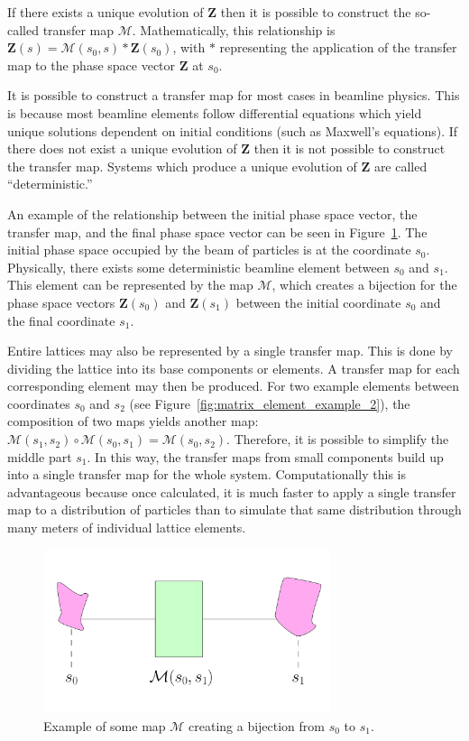 If there exists a unique evolution of $\mathbf{Z}$ then it is possible to construct the so-called transfer map $\mathcal{M}$. Mathematically, this relationship is $\mathbf{Z}(s)=\mathcal{M}(s_0 , s)*\mathbf{Z}(s_0)$, with $*$ representing the application of the transfer map to the phase space vector $\mathbf{Z}$ at $s_0$. 

It is possible to construct a transfer map for most cases in beamline physics. This is because most beamline elements follow differential equations which yield unique solutions dependent on initial conditions (such as Maxwell's equations). If there does not exist a unique evolution of $\mathbf{Z}$ then it is not possible to construct the transfer map. Systems which produce a unique evolution of $\mathbf{Z}$ are called ``deterministic.''

An example of the relationship between the initial phase space vector, the transfer map, and the final phase space vector can be seen in Figure~\ref{fig:matrix_element_example_1}. The initial phase space occupied by the beam of particles is at the coordinate $s_0$. Physically, there exists some deterministic beamline element between $s_0$ and $s_1$. This element can be represented by the map $\mathcal{M}$, which creates a bijection for the phase space vectors $\mathbf{Z}(s_0)$ and $\mathbf{Z}(s_1)$ between the initial coordinate $s_0$ and the final coordinate $s_1$. 

Entire lattices may also be represented by a single transfer map. This is done by dividing the lattice into its base components or elements. A transfer map for each corresponding element may then be produced. For two example elements between coordinates $s_0$ and $s_2$ (see Figure~\ref{fig:matrix_element_example_2}), the composition of two maps yields another map: $\mathcal{M}(s_1 , s_2)\circ \mathcal{M}(s_0 , s_1) = \mathcal{M}(s_0 , s_2)$.  Therefore, it is possible to simplify the middle part $s_1$. In this way, the transfer maps from small components build up into a single transfer map for the whole system. Computationally this is advantageous because once calculated, it is much faster to apply a single transfer map to a distribution of particles than to simulate that same distribution through many meters of individual lattice elements.

\begin{figure}[h!]
  \centering
    \includegraphics[width=0.75\textwidth]{Figures/matrix_element_example_1} 
  \caption{Example of some map $\mathcal{M}$ creating a bijection from $s_0$ to $s_1$.}
  \label{fig:matrix_element_example_1}
\end{figure}

